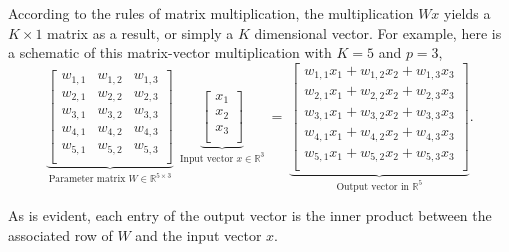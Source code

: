 According to the rules of matrix multiplication, the multiplication $Wx$ yields a $K \times 1$ matrix as a result, or simply a $K$ dimensional vector. For example, here is a schematic of this matrix-vector multiplication with $K = 5$ and $p=3$,
%
\begin{equation}
\label{eq:matrix-vector-mult} 
\underbrace{
\begin{bmatrix}
w_{1,1} & w_{1,2} & w_{1,3}  \\
w_{2,1} & w_{2,2} & w_{2,3}\\
w_{3,1} & w_{3,2} & w_{3,3}\\
w_{4,1} & w_{4,2} & w_{4,3}\\
w_{5,1} & w_{5,2} & w_{5,3}\\
\end{bmatrix}
}
_
{
\textrm{Parameter matrix $W \in {\mathbb R}^{5 \times 3}$}
}
~~
\underbrace{
\begin{bmatrix}
x_1  \\
x_2 \\
x_3 \\
\end{bmatrix}
}
_
{\textrm{Input vector $x \in {\mathbb R}^3$}}
~
=
~
\underbrace{
\begin{bmatrix}
w_{1,1}x_1 + w_{1,2} x_2 + w_{1,3} x_3 \\
w_{2,1}x_1 + w_{2,2} x_2 + w_{2,3} x_3\\
w_{3,1}x_1 + w_{3,2} x_2 + w_{3,3} x_3\\
w_{4,1}x_1 + w_{4,2} x_2 + w_{4,3} x_3\\
w_{5,1}x_1 + w_{5,2} x_2 + w_{5,3} x_3\\
\end{bmatrix}
}
_{
\textrm{Output vector in ${\mathbb R}^5$}
}.
\end{equation}

%
As is evident, each entry of the output vector is the inner product between the associated row of $W$ and the input vector $x$.

